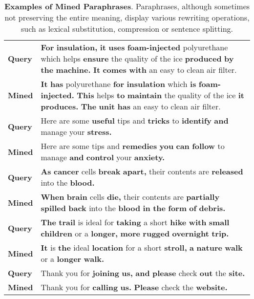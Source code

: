 \documentclass[11pt]{article}
\begin{document}
\begin{table*}[t]
\centering
\small
\begin{tabular}{@{}lp{}@{}}
\toprule
\textbf{Query} & \textbf{For} \textbf{insulation,} \textbf{it} \textbf{uses} \textbf{foam-injected} polyurethane which helps \textbf{ensure} the quality of the ice \textbf{produced} \textbf{by} \textbf{the} \textbf{machine.} \textbf{It} \textbf{comes} \textbf{with} an easy to clean air filter. \\
\textbf{Mined} & \textbf{It} \textbf{has} polyurethane \textbf{for} \textbf{insulation} which \textbf{is} \textbf{foam-injected.} \textbf{This} helps \textbf{to} \textbf{maintain} the quality of the ice \textbf{it} \textbf{produces.} \textbf{The} \textbf{unit} \textbf{has} an easy to clean air filter. \\
\midrule

\textbf{Query} & Here are some \textbf{useful} tips and \textbf{tricks} to \textbf{identify} \textbf{and} manage your \textbf{stress.} \\
\textbf{Mined} & Here are some tips and \textbf{remedies} \textbf{you} \textbf{can} \textbf{follow} to manage \textbf{and} \textbf{control} your \textbf{anxiety.} \\
\midrule

\textbf{Query} & \textbf{As} \textbf{cancer} cells \textbf {break} \textbf{apart,} their contents are \textbf{released} into the \textbf{blood.} \\
\textbf{Mined} & \textbf{When} \textbf{brain} cells \textbf{die,} their contents are \textbf{partially} \textbf{spilled} \textbf{back} into the \textbf{blood} \textbf{in} \textbf{the} \textbf{form} \textbf{of} \textbf{debris.} \\
\midrule

\textbf{Query} & \textbf{The} \textbf{trail} is ideal for \textbf{taking} a short \textbf{hike} \textbf{with} \textbf{small} \textbf{children} or a \textbf{longer,} \textbf{more} \textbf{rugged} \textbf{overnight} \textbf{trip.} \\
\textbf{Mined} & \textbf{It} is \textbf{the} ideal \textbf{location} for a short \textbf{stroll,} \textbf{a} \textbf{nature} \textbf{walk} or a \textbf{longer} \textbf{walk.} \\
\midrule
\textbf{Query} & Thank you for \textbf{joining} \textbf{us,} \textbf{and} \textbf{please} check \textbf{out} the \textbf{site.} \\
\textbf{Mined} & Thank you for \textbf{calling} \textbf{us.} \textbf{Please} check the \textbf{website.} \\
\midrule
\end{tabular}
\caption{\textbf{Examples of Mined Paraphrases}. Paraphrases, although sometimes not preserving the entire meaning, display various rewriting operations, such as lexical substitution, compression or sentence splitting.}
\label{table:mining_examples}
\end{table*} 
\end{document}
